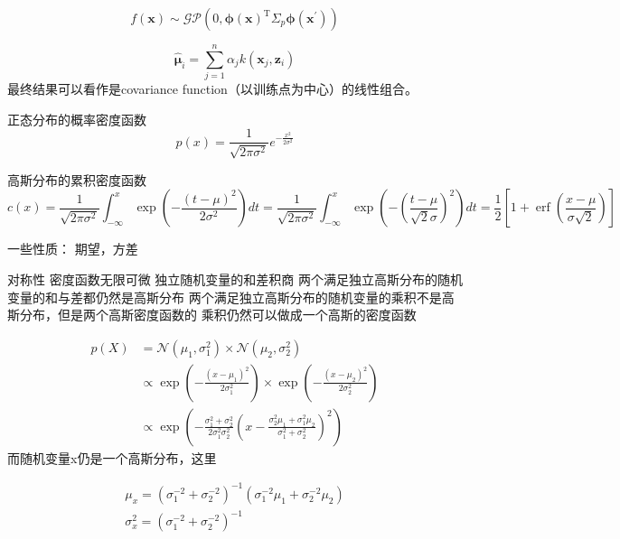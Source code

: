 \documentclass[a4paper, 12pt, CJKnumber, UTF8, openany,nofonts, fancyhdr]{ctexbook}
\begin{document}
\begin{equation}
f(\boldsymbol{x}) \sim \mathcal{G P}\left(0, \boldsymbol{\phi}(\boldsymbol{x})^{\mathrm{T}} \Sigma_{p} \boldsymbol{\phi}\left(\boldsymbol{x}^{\prime}\right)\right)
\end{equation}

\begin{equation}
\hat{\boldsymbol{\mu}}_{i}=\sum_{j=1}^{n} \alpha_{j} k\left(\boldsymbol{x}_{j}, \boldsymbol{z}_{i}\right)
\end{equation}
最终结果可以看作是covariance function（以训练点为中心）的线性组合。

正态分布的概率密度函数
\begin{equation}
p(x)=\frac{1}{\sqrt{2 \pi \sigma^{2}}} e^{-\frac{x^{2}}{2 \sigma^{2}}}
\end{equation}

高斯分布的累积密度函数
\begin{equation}
c(x)=\frac{1}{\sqrt{2 \pi \sigma^{2}}} \int_{-\infty}^{x} \exp \left(-\frac{(t-\mu)^{2}}{2 \sigma^{2}}\right) d t=\frac{1}{\sqrt{2 \pi \sigma^{2}}} \int_{-\infty}^{x} \exp \left(-\left(\frac{t-\mu}{\sqrt{2} \sigma}\right)^{2}\right) d t=\frac{1}{2}\left[1+\operatorname{erf}\left(\frac{x-\mu}{\sigma \sqrt{2}}\right)\right]
\end{equation}

一些性质：
期望，方差

对称性
密度函数无限可微
独立随机变量的和差积商
两个满足独立高斯分布的随机变量的和与差都仍然是高斯分布
两个满足独立高斯分布的随机变量的乘积不是高斯分布，但是两个高斯密度函数的
乘积仍然可以做成一个高斯的密度函数

\begin{equation}
\begin{aligned} p(X) &=\mathcal{N}\left(\mu_{1}, \sigma_{1}^{2}\right) \times \mathcal{N}\left(\mu_{2}, \sigma_{2}^{2}\right) \\ & \propto \exp \left(-\frac{\left(x-\mu_{1}\right)^{2}}{2 \sigma_{1}^{2}}\right) \times \exp \left(-\frac{\left(x-\mu_{2}\right)^{2}}{2 \sigma_{2}^{2}}\right) \\ & \propto \exp \left(-\frac{\sigma_{1}^{2}+\sigma_{2}^{2}}{2 \sigma_{1}^{2} \sigma_{2}^{2}}\left(x-\frac{\sigma_{2}^{2} \mu_{1}+\sigma_{1}^{2} \mu_{2}}{\sigma_{1}^{2}+\sigma_{2}^{2}}\right)^{2}\right) \end{aligned}
\end{equation}
而随机变量x仍是一个高斯分布，这里

\begin{equation}
\begin{array}{l}{\mu_{x}=\left(\sigma_{1}^{-2}+\sigma_{2}^{-2}\right)^{-1}\left(\sigma_{1}^{-2} \mu_{1}+\sigma_{2}^{-2} \mu_{2}\right)} \\ {\sigma_{x}^{2}=\left(\sigma_{1}^{-2}+\sigma_{2}^{-2}\right)^{-1}}\end{array}
\end{equation}
\end{document}
